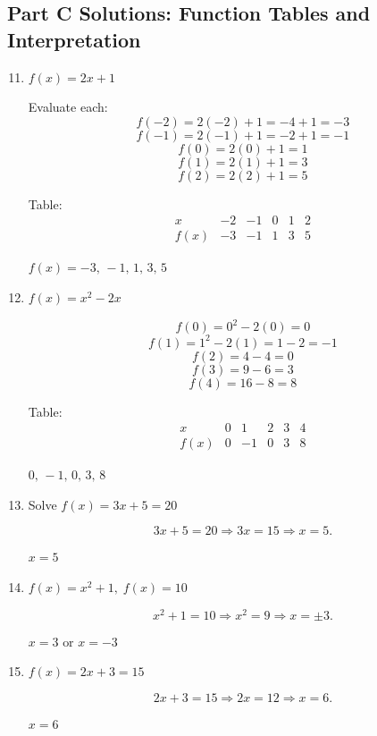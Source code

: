 \documentclass[14pt]{extarticle}
\begin{document}
\subsection*{Part C Solutions: Function Tables and Interpretation}
\begin{enumerate}
  \setcounter{enumi}{10}
  \item \(f(x) = 2x + 1\)

  Evaluate each:
  \[
  f(-2)=2(-2)+1=-4+1=-3
  \]
  \[
  f(-1)=2(-1)+1=-2+1=-1
  \]
  \[
  f(0)=2(0)+1=1
  \]
  \[
  f(1)=2(1)+1=3
  \]
  \[
  f(2)=2(2)+1=5
  \]

  Table:
  \[
  \begin{array}{c|ccccc}
  x & -2 & -1 & 0 & 1 & 2 \\ \hline
  f(x) & -3 & -1 & 1 & 3 & 5
  \end{array}
  \]

  \(\boxed{f(x) = -3,\,-1,\,1,\,3,\,5}\)

  \item \(f(x) = x^2 - 2x\)

  \[
  f(0)=0^2-2(0)=0
  \]
  \[
  f(1)=1^2-2(1)=1-2=-1
  \]
  \[
  f(2)=4-4=0
  \]
  \[
  f(3)=9-6=3
  \]
  \[
  f(4)=16-8=8
  \]

  Table:
  \[
  \begin{array}{c|ccccc}
  x & 0 & 1 & 2 & 3 & 4 \\ \hline
  f(x) & 0 & -1 & 0 & 3 & 8
  \end{array}
  \]

  \(\boxed{0,\,-1,\,0,\,3,\,8}\)

  \item Solve \(f(x) = 3x + 5 = 20\)

  \[
  3x + 5 = 20 \Rightarrow 3x = 15 \Rightarrow x = 5.
  \]

  \(\boxed{x = 5}\)

  \item \(f(x) = x^2 + 1,\; f(x) = 10\)

  \[
  x^2 + 1 = 10 \Rightarrow x^2 = 9 \Rightarrow x = \pm 3.
  \]

  \(\boxed{x = 3 \text{ or } x = -3}\)

  \item \(f(x) = 2x + 3 = 15\)

  \[
  2x + 3 = 15 \Rightarrow 2x = 12 \Rightarrow x = 6.
  \]

  \(\boxed{x = 6}\)
\end{enumerate}
\end{document}
